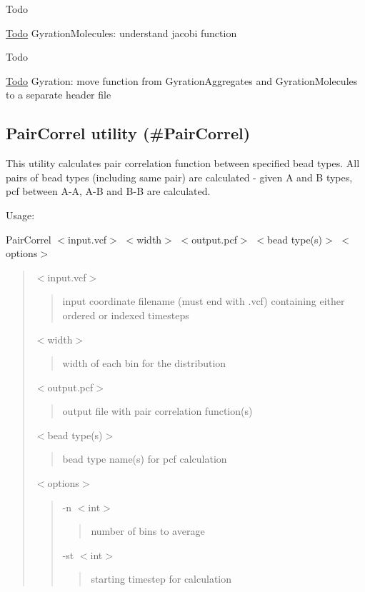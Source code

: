 \begin{DoxyRefDesc}{Todo}
\item[\hyperlink{todo__todo000005}{Todo}]Gyration\+Molecules\+: understand {\ttfamily jacobi} function\end{DoxyRefDesc}


\begin{DoxyRefDesc}{Todo}
\item[\hyperlink{todo__todo000006}{Todo}]Gyration\+: move function from Gyration\+Aggregates and Gyration\+Molecules to a separate header file\end{DoxyRefDesc}


\subsection*{Pair\+Correl utility (\#\+Pair\+Correl)}

This utility calculates pair correlation function between specified bead types. All pairs of bead types (including same pair) are calculated -\/ given A and B types, pcf between A-\/A, A-\/B and B-\/B are calculated.

Usage\+:

{\ttfamily Pair\+Correl $<$input.\+vcf$>$ $<$width$>$ $<$output.\+pcf$>$ $<$bead type(s)$>$ $<$options$>$}

\begin{quote}
{\ttfamily $<$input.\+vcf$>$} \begin{quote}
input coordinate filename (must end with {\ttfamily .vcf}) containing either ordered or indexed timesteps \end{quote}
{\ttfamily $<$width$>$} \begin{quote}
width of each bin for the distribution \end{quote}
{\ttfamily $<$output.\+pcf$>$} \begin{quote}
output file with pair correlation function(s) \end{quote}
{\ttfamily $<$bead type(s)$>$} \begin{quote}
bead type name(s) for pcf calculation \end{quote}
{\ttfamily $<$options$>$} \begin{quote}
{\ttfamily -\/n $<$int$>$} \begin{quote}
number of bins to average \end{quote}
{\ttfamily -\/st $<$int$>$} \begin{quote}
starting timestep for calculation \end{quote}
\end{quote}
\end{quote}



